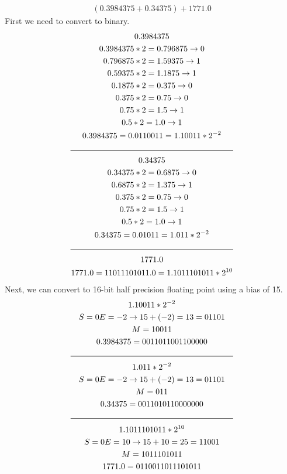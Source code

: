 \documentclass[11pt]{article}
\begin{document}
\begin{gather*}
(0.3984375 + 0.34375) + 1771.0
\end{gather*}
First we need to convert to binary.
\begin{gather*}
0.3984375 \\
0.3984375 * 2 = 0.796875 \rightarrow 0\\
0.796875 * 2 = 1.59375 \rightarrow 1 \\
0.59375 * 2 = 1.1875 \rightarrow 1 \\
0.1875 * 2 = 0.375 \rightarrow 0 \\
0.375 * 2 = 0.75 \rightarrow 0 \\
0.75 * 2 = 1.5 \rightarrow 1 \\
0.5 * 2 = 1.0 \rightarrow 1 \\ 
0.3984375 = 0.0110011 = 1.10011 * 2^{-2} \\
\rule{7cm}{.5pt} \\
0.34375 \\
0.34375 * 2 = 0.6875 \rightarrow 0 \\
0.6875 * 2 = 1.375 \rightarrow 1 \\
0.375 * 2 = 0.75 \rightarrow 0 \\
0.75 * 2 = 1.5 \rightarrow 1 \\
0.5 * 2 = 1.0 \rightarrow 1 \\
0.34375 = 0.01011 = 1.011 * 2^{-2} \\
\rule{7cm}{.5pt} \\
1771.0 \\
1771.0 = 11011101011.0 = 1.1011101011 * 2^{10}
\end{gather*}
Next, we can convert to 16-bit half precision floating point using a bias of 15.
\begin{gather*}
1.10011 * 2^{-2} \\
S = 0
E = -2 \rightarrow 15+(-2) = 13 = 01101 \\
M = 10011 \\
0.3984375 = 0011011001100000 \\
\rule{7cm}{.5pt} \\
1.011 * 2^{-2} \\
S = 0
E = -2 \rightarrow 15+(-2) = 13 = 01101 \\
M = 011 \\
0.34375 = 0011010110000000 \\
\rule{7cm}{.5pt} \\
1.1011101011 * 2^{10} \\
S = 0
E = 10 \rightarrow 15+10 = 25 = 11001 \\
M = 1011101011 \\
1771.0 = 0110011011101011 \\
\end{gather*}
\end{document}
